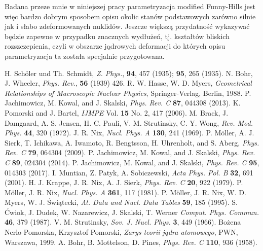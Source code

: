 \documentclass[a4paper,polish,twoside]{article}
\numberwithin{equation}{section}
\begin{document}
Badana przeze mnie w niniejszej pracy parametryzacja modified Funny-Hills jest więc bardzo dobrym sposobem opisu okolic stanów podstawowych zarówno silnie jak i słabo zdeformowanych nuklidów. Jeszcze większą przydatność wykazywać będzie zapewne w przypadku znacznych wydłużeń, tj. kształtów bliskich rozszczepienia, czyli w obszarze jądrowych deformacji do których opisu parametryzacja ta została specjalnie przygotowana.

\clearpage
\begin{thebibliography}{9}

H. Sch{\"o}ler und Th. Schmidt, \textit{Z. Phys.}, \textbf{94}, 457 (1935);  \textbf{95}, 265 (1935).
N. Bohr, J. Wheeler, \textit{Phys. Rev.}, \textbf{56} (1939) 426.
R. W. Hasse, W. D. Myers, \textit{Geometrical Relationships of Macroscopic Nuclear Physics}, Springer-Verlag, Berlin, 1988. 
P. Jachimowicz, M. Kowal, and J. Skalski, \textit{Phys. Rev. C} \textbf{87}, 044308 (2013).
K. Pomorski and J. Bartel, \textit{IJMPE} Vol. \textbf{15} No. 2, 417 (2006).
M. Brack, J. Damgaard, A. S. Jensen, H. C. Pauli, V. M. Strutinsky, C. Y. Wong, \textit{Rev. Mod. Phys.} \textbf{44}, 320 (1972).
J. R. Nix, \textit{Nucl. Phys. A} \textbf{130}, 241 (1969).
P. M{\"o}ller, A. J. Sierk, T. Ichikawa, A. Iwamoto, R. Bengtsson, H. Uhrenholt, and S. Aberg, \textit {Phys. Rev. C} \textbf{79}, 064304 (2009).
P. Jachimowicz, M. Kowal, and J. Skalski, \textit{Phys. Rev. C} \textbf{89}, 024304 (2014).
P. Jachimowicz, M. Kowal, and J. Skalski, \textit{Phys. Rev. C} \textbf{95}, 014303 (2017).
I. Muntian, Z. Patyk, A. Sobiczewski, \textit{Acta Phys. Pol. B} \textbf{32}, 691 (2001).
H. J. Krappe, J. R. Nix, A. J. Sierk, \textit{Phys. Rev. C} \textbf{20}, 922 (1979).
P. M{\"o}ller, J. R. Nix, \textit{Nucl. Phys. A} \textbf{361}, 117 (1981).
P. M{\"o}ller, J. R. Nix, W. D. Myers, W. J. Świątecki, \textit{At. Data and Nucl. Data Tables} \textbf{59}, 185 (1995).
S. Ćwiok, J. Dudek, W. Nazarewicz, J. Skalski, T. Werner \textit{Comput. Phys. Commun.} \textbf{46}, 379 (1987).
V. M. Strutinsky, \textit{Sov. J. Nucl. Phys.} \textbf{3}, 449 (1966).
Bożena Nerlo-Pomorska, Krzysztof Pomorski, \textit{Zarys teorii jądra atomowego}, PWN, Warszawa, 1999.
A. Bohr, B. Mottelson, D. Pines, \textit{Phys. Rev. C} \textbf{110}, 936 (1958).

\end{thebibliography}
\end{document}
